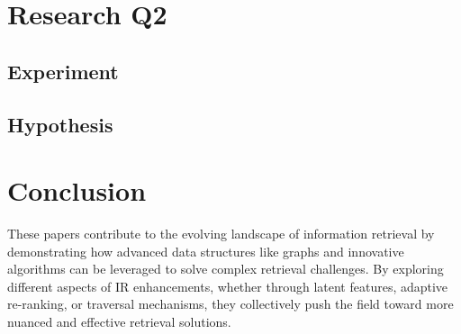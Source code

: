 \documentclass[sigconf,authorversion,nonacm]{acmart}
\begin{document}
\section{Research Q2}

\subsection{Experiment}

\subsection{Hypothesis}
\section{Conclusion}

These papers contribute to the evolving landscape of information retrieval by demonstrating how
advanced data structures like graphs and innovative algorithms can be leveraged to solve complex
retrieval challenges. By exploring different aspects of IR enhancements, whether through latent
features, adaptive re-ranking, or traversal mechanisms, they collectively push the field toward more
nuanced and effective retrieval solutions.

\section*{}


\end{document}
